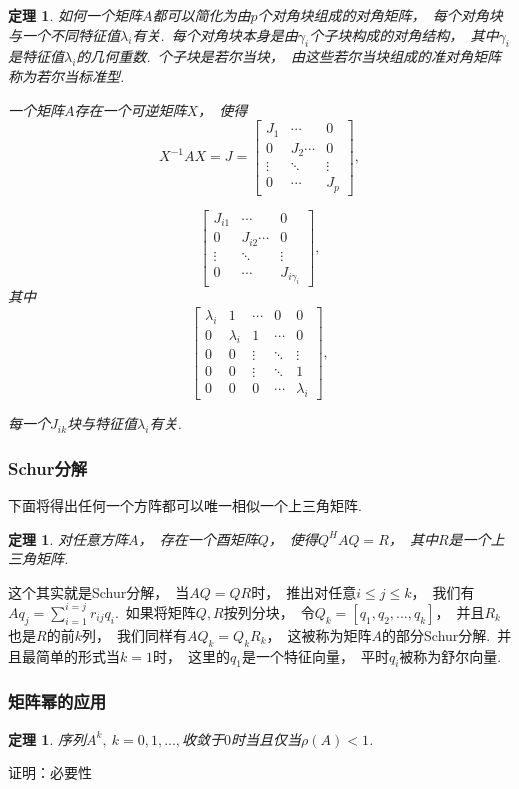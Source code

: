 \documentclass{article}
\begin{document}
\newtheorem{thm}{定理}
\begin{thm}
如何一个矩阵$A$都可以简化为由$p$个对角块组成的对角矩阵，~每个对角块与一个不同特征值$\lambda _i$有关.~每个对角块本身是由$\gamma _i$个子块构成的对角结构，~其中$\gamma _i$是特征值$\lambda _i$的几何重数.~个子块是若尔当块，~由这些若尔当块组成的准对角矩阵称为若尔当标准型.

一个矩阵$A$存在一个可逆矩阵$X$，~使得
$$X^{-1}AX=J=\begin{bmatrix}
J_1 &\cdots & 0\\
0 &J_2\cdots & 0\\
\vdots & \ddots & \vdots\\
0 & \cdots & J_p
\end{bmatrix},$$

$$\begin{bmatrix}
J_{i1} &\cdots & 0\\
0 &J_{i2}\cdots & 0\\
\vdots & \ddots & \vdots\\
0 & \cdots & J_{i\gamma _i}
\end{bmatrix},$$其中
$$\begin{bmatrix}
\lambda _i &1&\cdots & 0&0\\
0 &\lambda _i&1&\cdots & 0\\
0&0&\vdots & \ddots & \vdots\\
0&0&\vdots & \ddots &1\\
0 &0&0& \cdots &\lambda _i
\end{bmatrix},$$

每一个$J_{ik}$块与特征值$\lambda _i$有关.
\end{thm}
\subsubsection{Schur分解}
下面将得出任何一个方阵都可以唯一相似一个上三角矩阵.

\newtheorem{thm}{定理}
\begin{thm}
对任意方阵$A$，~存在一个酉矩阵$Q$，~使得$Q^HAQ=R$，~其中$R$是一个上三角矩阵.
\end{thm}

这个其实就是Schur分解，~当$AQ=QR$时，~推出对任意$i\leqslant j\leqslant k$，~我们有$Aq_j=\sum_{i=1}^{i=j} r_{ij}q_i$.~如果将矩阵$Q,R$按列分块，~令$Q_k=[q_1,q_2,...,q_k]$，~并且$R_k$也是$R$的前$k$列，~我们同样有$AQ_k=Q_kR_k$，~这被称为矩阵$A$的部分Schur分解.~并且最简单的形式当$k=1$时，~这里的$q_1$是一个特征向量，~平时$q_i$被称为舒尔向量.
\subsubsection{矩阵幂的应用}
\newtheorem{thm}{定理}
\begin{thm}
序列$A^k,\ k=0,1,...,$收敛于$0$时当且仅当$\rho (A)<1$.
\end{thm}
证明：必要性
\end{document}
